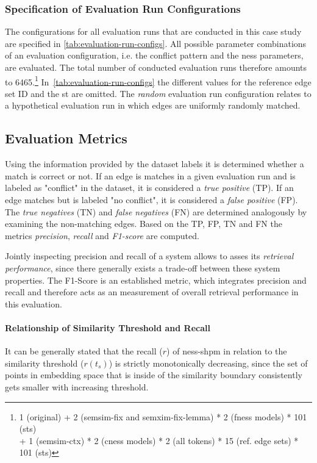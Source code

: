 \documentclass[11pt, numbers=noenddot]{scrreprt}
\begin{document}
\subsubsection{Specification of Evaluation Run Configurations}
\label{sec:evaluation-configurations}
The configurations for all evaluation runs that are conducted in this case study are specified in \cref{tab:evaluation-run-configs}. All possible parameter combinations of an evaluation configuration, i.e. the conflict pattern and the \gls{ness} parameters, are evaluated. The total number of conducted evaluation runs therefore amounts to 6465.\footnote{1 (original) + 2 (semsim-fix and semxim-fix-lemma) * 2 (\gls{fness} models) * 101 (\gls{st}s) \\ + 1 (semsim-ctx) * 2 (\gls{cness} models) * 2 (all tokens) * 15 (ref. edge sets) * 101 (\gls{st}s)} In \cref{tab:evaluation-run-configs} the different values for the reference edge set ID and the \gls{st} are omitted. The \textit{random} evaluation run configuration relates to a hypothetical evaluation run in which edges are uniformly randomly matched. 


\subsection{Evaluation Metrics}
\label{sec:evaluation-metrics}
Using the information provided by the dataset labels it is determined whether a match is correct or not. If an edge is matches in a given evaluation run and is labeled as "conflict" in the dataset, it is considered a \textit{true positive} (TP). If an edge matches but is labeled "no conflict", it is considered a \textit{false positive} (FP). The \textit{true negatives} (TN) and \textit{false negatives} (FN) are determined analogously  by examining the non-matching edges. Based on the TP, FP, TN and FN the metrics \textit{precision}, \textit{recall} and \textit{F1-score} are computed.

Jointly inspecting precision and recall of a system allows to asses its \textit{retrieval performance}, since there generally exists a trade-off between these system properties. The F1-Score is an established metric, which integrates precision and recall and therefore acts as an measurement of overall retrieval performance in this evaluation.

\paragraph{Relationship of Similarity Threshold and Recall}
It can be generally stated that the recall (\(r\)) of \gls{ness-shpm} in relation to the similarity threshold (\(r(t_s)\)) is strictly monotonically decreasing, since the set of points in embedding space that is inside of the similarity boundary consistently gets smaller with increasing threshold.
\end{document}
